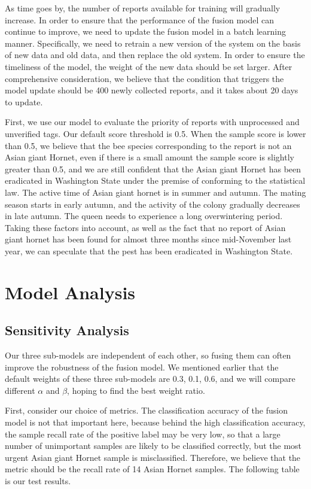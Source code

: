 \documentclass{mcmthesis}
\numberwithin{figure}{section}
\numberwithin{table}{section}
\begin{document}
As time goes by, the number of reports available for training will gradually increase. In order to ensure that the performance of the fusion model can continue to improve, we need to update the fusion model in a batch learning manner. Specifically, we need to retrain a new version of the system on the basis of new data and old data, and then replace the old system. In order to ensure the timeliness of the model, the weight of the new data should be set larger. After comprehensive consideration, we believe that the condition that triggers the model update should be 400 newly collected reports, and it takes about 20 days to update.

First, we use our model to evaluate the priority of reports with unprocessed and unverified tags. Our default score threshold is 0.5. When the sample score is lower than 0.5, we believe that the bee species corresponding to the report is not an Asian giant Hornet, even if there is a small amount the sample score is slightly greater than 0.5, and we are still confident that the Asian giant Hornet has been eradicated in Washington State under the premise of conforming to the statistical law. The active time of Asian giant hornet is in summer and autumn. The mating season starts in early autumn, and the activity of the colony gradually decreases in late autumn. The queen needs to experience a long overwintering period. Taking these factors into account, as well as the fact that no report of Asian giant hornet has been found for almost three months since mid-November last year, we can speculate that the pest has been eradicated in Washington State.

\section{Model Analysis}
\subsection{Sensitivity Analysis}
Our three sub-models are independent of each other, so fusing them can often improve the robustness of the fusion model. We mentioned earlier that the default weights of these three sub-models are 0.3, 0.1, 0.6, and we will compare different $\alpha$ and $\beta$, hoping to find the best weight ratio.

First, consider our choice of metrics. The classification accuracy of the fusion model is not that important here, because behind the high classification accuracy, the sample recall rate of the positive label may be very low, so that a large number of unimportant samples are likely to be classified correctly, but the most urgent Asian giant Hornet sample is misclassified. Therefore, we believe that the metric should be the recall rate of 14 Asian Hornet samples. The following table is our test results.
\end{document}
